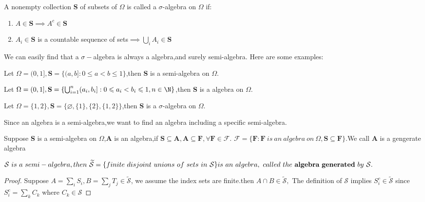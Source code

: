 \begin{definition}\label{def:sigma-algebra}
    A nonempty collection  \textbf{S} of subsets of $\Omega$ is called a $\sigma$-algebra on $\Omega$ if:\smallskip
    \begin{enumerate}
        \item $A \in \textbf{S} \implies A^c \in \textbf{S}$
        \item $A_i \in \textbf{S}$ is a countable sequence of sets$\implies \bigcup_i A_i \in \textbf{S}$
    \end{enumerate}
\end{definition}

We can easily find that a $\sigma-$algebra is always a algebra,and surely semi-algebra.
Here are some examples:\smallskip

\begin{example}
   Let $\Omega = (0,1],\textbf{S}=\{(a,b]:0\leqslant a<b\leqslant 1\}$,then \textbf{S} is a semi-algebra on $\Omega$.
\end{example}

\begin{example}[Algebra]
    Let $\Omega = (0,1],\textbf{S}=\{\bigcup_{i=1}^n(a_i,b_i]:0\leqslant a_i<b_i\leqslant 1,n \in \N\}$,then \textbf{S} is a algebra on $\Omega$.
\end{example}

\begin{example}
    Let $\Omega = \{1,2\},\textbf{S}=\{\varnothing ,\{1\},\{2\},\{1,2\}\}$,then \textbf{S} is a $\sigma$-algebra on $\Omega$.
\end{example}

Since an algebra is a semi-algebra,we want to find an algebra including a specific semi-algebra.

Suppose \textbf{S} is a semi-algebra on $\Omega$,\textbf{A} is an algebra,if $\textbf{S} \subseteq \textbf{A},\textbf{A} \subseteq \textbf{F}  ,\forall \textbf{F} \in \mathcal{F} $.
$\mathcal{F} = \{\textbf{F}: \textbf{F}\ is\ an\ algebra\ on\ \Omega,\textbf{S} \subseteq \textbf{F}\}$.We call \textbf{A} is a gengerate algebra 

\begin{lemma}
    $
    \mathcal{S} \ is\ a \ semi-algebra,then \ \widetilde{\mathcal{S}}=\{finite\ disjoint\ unions\ of\ sets\ in\ \mathcal{S} \}
    \\
     is \ an \ algebra,\ called\ the\ \textbf{algebra}\ \textbf{generated}\ by\ \mathcal{S}.$
\end{lemma}
\begin{proof}[Proof]
    Suppose $A=\sum_{i} S_i,B=\sum_{j} T_j \in \widetilde{\mathcal{S}} $, we assume the index sets are finite.then $A \cap B \in \widetilde{\mathcal{S}},$ The definition of $\mathcal{S}$ implies $S_i^c \in \widetilde{\mathcal{S}}$ since $S_i^c=\sum_{k}C_k$ where $C_k \in \mathcal{S}$
\end{proof}



